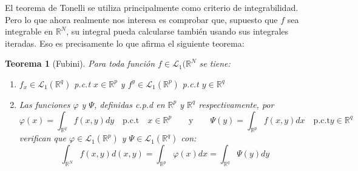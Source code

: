 \documentclass[a4paper, 12pt]{article}
\newtheorem*{teorema*}{Teorema}
\begin{document}
\begin{enumerate}[label=\textbf{\arabic*}.]
\begin{enumerate}[label=\textit{\alph*)}]
		El teorema de Tonelli se utiliza principalmente como criterio de integrabilidad. Pero lo que ahora realmente nos interesa es comprobar que, supuesto que \(f\) sea integrable en \(\mathbb{R}^N\), su integral pueda calcularse también usando sus integrales iteradas. Eso es precisamente lo que afirma el siguiente teorema:
		\begin{teorema*}[Fubini]
		Para toda función \(f \in \mathcal{L}_1 (\mathbb{R}^N\) se tiene:
		\begin{enumerate}[label=(\textit{\roman*})]
			\item \(f_x \in \mathcal{L}_1 (\mathbb{R}^q)\) p.c.t \(x \in \mathbb{R}^p\) y \(f^y \in \mathcal{L}_1 (\mathbb{R}^p)\) p.c.t \(y \in \mathbb{R}^q\)
			\item Las funciones \(\varphi\) y \(\Psi\), definidas c.p.d en \(\mathbb{R}^p\) y \(\mathbb{R}^q\) respectivamente, por
			\[
				\varphi (x) = \int_{\mathbb{R}^q} f(x,y)dy \quad \text{p.c.t} \quad x \in \mathbb{R}^p \qquad \text{y} \qquad \Psi (y) = \int_{\mathbb{R}^p} f(x,y) dx \quad \text{p.c.t} y \in \mathbb{R}^q
			\]
			verifican que \(\varphi \in \mathcal{L}_1 (\mathbb{R}^p)\) y \(\Psi \in \mathcal{L}_1 (\mathbb{R}^q)\) con:
			\[
				\int_{\mathbb{R}^N} f(x,y) d(x,y) = \int_{\mathbb{R}^p} \varphi (x) dx = \int_{\mathbb{R}^q} \Psi (y) dy
			\]
		\end{enumerate}
		\end{teorema*}
	
	\end{enumerate}
\end{enumerate}
\end{document}
